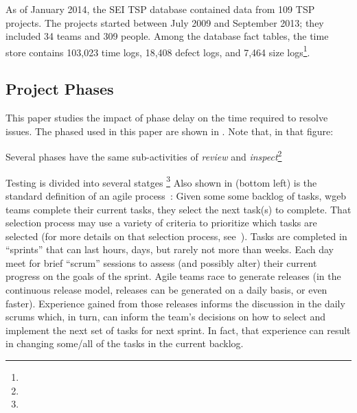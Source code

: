 As of January 2014, the SEI TSP database contained data from 109
TSP projects. The projects started between July 2009 and
September 2013; they included 34 teams and 309 people. Among
the database fact tables, the time store contains 103,023 time logs,
18,408 defect logs, and 7,464 size logs\footnote{}.  


%
 
\subsection{Project Phases}
This paper studies the impact of phase delay on the time required to resolve issues.
The phased used in this paper are shown in . Note that, in that figure:
\bi 
\item
Several  phases have the same  sub-activities of {\em review} and {\em inspect}\footnote{}
\item Testing is divided into several statges \footnote{}
\ei 
Also shown in  (bottom left) is the standard definition of an agile process~\cite{boehmturner03}:
Given some
some backlog of tasks, wgeb teams complete their current tasks, they select the next task(s) to complete. That selection process may use a variety of criteria
to prioritize which  tasks are selected (for more details on that selection process, see~\cite{me09j,port08,boehmturner03}). Tasks are completed in ``sprints'' that can last hours,
days, but rarely not more than weeks. Each day meet for brief ``scrum'' sessions to assess (and possibly alter) their current progress on the goals of the sprint.  
Agile teams race to generate releases
(in the continuous release model, releases can be generated on a daily basis, or even faster).  
Experience gained from those releases informs the discussion in the daily scrums which, in turn,
can inform the team's decisions on how to select and implement the next set of tasks for next sprint.
In fact, that experience can result in changing some/all of the tasks in the current backlog. 

